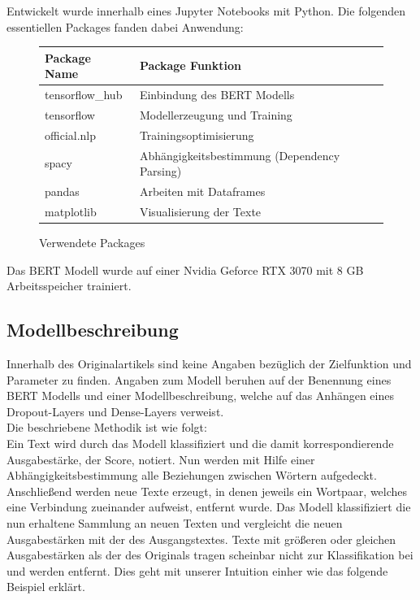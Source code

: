 \documentclass[DIV=13,fontsize=11pt]{scrartcl}
\begin{document}
Entwickelt wurde innerhalb eines Jupyter Notebooks mit Python.
Die folgenden essentiellen Packages fanden dabei Anwendung:

\begin{figure}[H]
    \centering
    \begin{tabular}{ll}
        \toprule
        Package Name    & Package Funktion                             \\
        \midrule
        tensorflow\_hub & Einbindung des BERT Modells                  \\
        tensorflow      & Modellerzeugung und Training                 \\
        official.nlp    & Trainingsoptimisierung                       \\
        spacy           & Abhängigkeitsbestimmung (Dependency Parsing) \\
        pandas          & Arbeiten mit Dataframes                      \\
        matplotlib      & Visualisierung der Texte                     \\
        \bottomrule
    \end{tabular}
    \caption{Verwendete Packages}
    \label{fig:packages}
\end{figure}

Das BERT Modell wurde auf einer Nvidia Geforce RTX 3070 mit 8 GB Arbeitsspeicher
trainiert.

\subsection{Modellbeschreibung}

Innerhalb des Originalartikels sind keine Angaben bezüglich der Zielfunktion und
Parameter zu finden. Angaben zum Modell beruhen auf der Benennung eines BERT Modells und
einer Modellbeschreibung, welche auf das Anhängen eines Dropout-Layers und
Dense-Layers verweist.\\

Die beschriebene Methodik ist wie folgt:\\

Ein Text wird durch das Modell klassifiziert und die damit korrespondierende
Ausgabestärke, der Score, notiert. Nun werden mit Hilfe einer Abhängigkeitsbestimmung
alle Beziehungen zwischen Wörtern aufgedeckt. Anschließend werden neue Texte
erzeugt, in denen jeweils ein Wortpaar, welches eine Verbindung zueinander
aufweist, entfernt wurde. Das Modell klassifiziert die nun
erhaltene Sammlung an neuen Texten und vergleicht die neuen Ausgabestärken mit der des
Ausgangstextes. Texte mit größeren oder gleichen Ausgabestärken
als der des Originals tragen scheinbar nicht zur Klassifikation bei und werden
entfernt. Dies geht mit unserer Intuition einher wie das folgende Beispiel erklärt.\\
\end{document}
